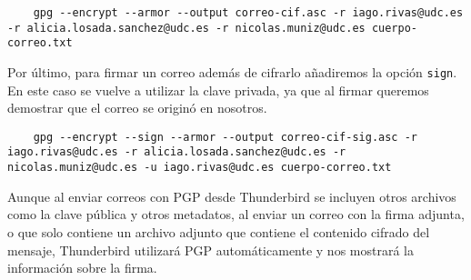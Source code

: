 \begin{verbatim}
    gpg --encrypt --armor --output correo-cif.asc -r iago.rivas@udc.es -r alicia.losada.sanchez@udc.es -r nicolas.muniz@udc.es cuerpo-correo.txt
\end{verbatim}

Por último, para firmar un correo además de cifrarlo añadiremos la opción \texttt{sign}. En este caso se vuelve a utilizar la clave privada, ya que al firmar queremos demostrar que el correo se originó en nosotros.

\begin{verbatim}
    gpg --encrypt --sign --armor --output correo-cif-sig.asc -r iago.rivas@udc.es -r alicia.losada.sanchez@udc.es -r nicolas.muniz@udc.es -u iago.rivas@udc.es cuerpo-correo.txt
\end{verbatim}

Aunque al enviar correos con PGP desde Thunderbird se incluyen otros archivos como la clave pública y otros metadatos, al enviar un correo con la firma adjunta, o que solo contiene un archivo adjunto que contiene el contenido cifrado del mensaje, Thunderbird utilizará PGP automáticamente y nos mostrará la información sobre la firma.